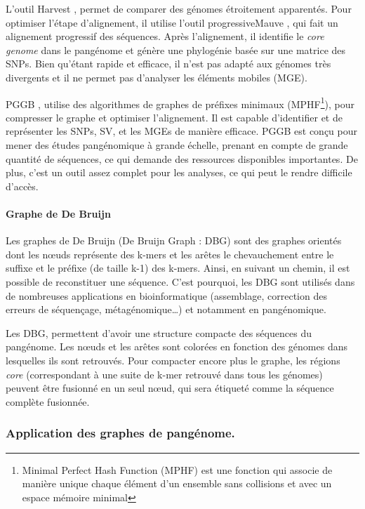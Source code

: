 L'outil Harvest \cite{treangen_harvest_2014}, permet de comparer des génomes étroitement apparentés. Pour optimiser l'étape d'alignement, il utilise l'outil progressiveMauve \cite{darling_progressivemauve_2010}, qui fait un alignement progressif des séquences. Après l'alignement, il identifie le \textit{core genome} dans le pangénome et génère une phylogénie basée sur une matrice des SNPs. Bien qu'étant rapide et efficace, il n'est pas adapté aux génomes très divergents et il ne permet pas d'analyser les éléments mobiles (MGE).

PGGB \cite{garrison_building_2024}, utilise des algorithmes de graphes de préfixes minimaux (MPHF\footnote{Minimal Perfect Hash Function (MPHF) est une fonction qui associe de manière unique chaque élément d’un ensemble sans collisions et avec un espace mémoire minimal}), pour compresser le graphe et optimiser l'alignement. Il est capable d'identifier et de représenter les SNPs, SV, et les MGEs de manière efficace. PGGB est conçu pour mener des études pangénomique à grande échelle, prenant en compte de grande quantité de séquences, ce qui demande des ressources disponibles importantes. De plus, c'est un outil assez complet pour les analyses, ce qui peut le rendre difficile d'accès.

\paragraph{Graphe de De Bruijn}

Les graphes de De Bruijn (De Bruijn Graph : DBG) sont des graphes orientés dont les n\oe uds représente des k-mers et les arêtes le chevauchement entre le suffixe et le préfixe (de taille k-1) des k-mers. Ainsi, en suivant un chemin, il est possible de reconstituer une séquence. C'est pourquoi, les DBG sont utilisés dans de nombreuses applications en bioinformatique (assemblage, correction des erreurs de séquençage, métagénomique\dots) et notamment en pangénomique.

Les DBG, permettent d'avoir une structure compacte des séquences du pangénome. Les n\oe uds et les arêtes sont colorées en fonction des génomes dans lesquelles ils sont retrouvés. Pour compacter encore plus le graphe, les régions \textit{core} (correspondant à une suite de k-mer retrouvé dans tous les génomes) peuvent être fusionné en un seul n\oe ud, qui sera étiqueté comme la séquence complète fusionnée.


\subsubsection{Application des graphes de pangénome.}